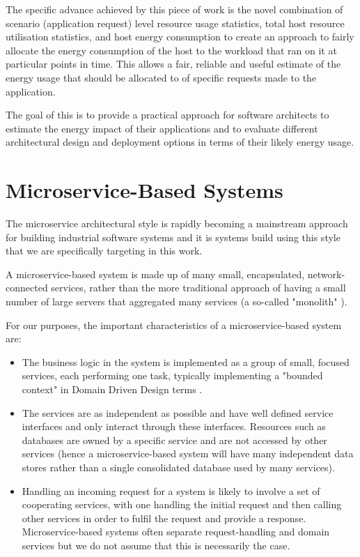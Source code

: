 The specific advance achieved by this piece of work is the novel combination of scenario (application request) level resource usage statistics, total host resource utilisation statistics, and host energy consumption to create an approach to fairly allocate the energy consumption of the host to the workload that ran on it at particular points in time.  This allows a fair, reliable and useful estimate of the energy usage that should be allocated to of specific requests made to the application.

The goal of this is to provide a practical approach for software architects to estimate the energy impact of their applications and to evaluate different architectural design and deployment options in terms of their likely energy usage.

\section{Microservice-Based Systems}

The microservice architectural style \cite{richardson2018_microservices} is rapidly becoming a mainstream approach for building industrial software systems and it is systems build using this style that we are specifically targeting in this work.

A microservice-based system is made up of many small, encapsulated, network-connected services, rather than the more traditional approach of having a small number of large servers that aggregated many services (a so-called "monolith" \cite{mazlami2017_microservices_monoliths}).

For our purposes, the important characteristics of a microservice-based system are:

\begin{itemize}
\item The business logic in the system is implemented as a group of small, focused services, each performing one task, typically implementing a "bounded context" in Domain Driven Design terms \cite{evans2006_ddd}.
\item The services are as independent as possible and have well defined service interfaces and only interact through these interfaces.  Resources such as databases are owned by a specific service and are not accessed by other services (hence a microservice-based system will have many independent data stores rather than a single consolidated database used by many services).
\item Handling an incoming request for a system is likely to involve a set of cooperating services, with one handling the initial request and then calling other services in order to fulfil the request and provide a response.  Microservice-based systems often separate request-handling and domain services but we do not assume that this is necessarily the case.
\end{itemize}

